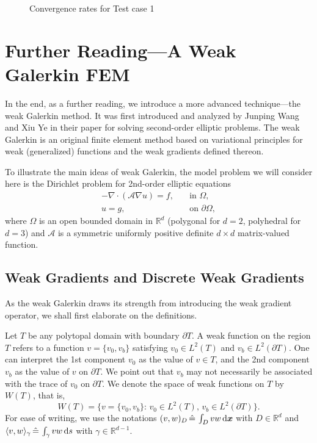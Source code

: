 \begin{figure}[!htbp]
{		}
		\caption{Convergence rates for Test case 1}
		\label{fig:1D convergence rates for test case 1}
	\end{figure}
	
	\clearpage
	\section{Further Reading---A Weak Galerkin FEM}\label{section.6}
	In the end, as a further reading, we introduce a more advanced
	technique---the weak Galerkin method. It was first introduced and analyzed
	by Junping Wang and Xiu Ye in their paper \cite{WG2013} for solving
	second-order elliptic problems. The weak Galerkin 
	is an original finite element method based on variational principles for 
	weak (generalized) functions and the weak gradients defined thereon.
	
	To illustrate the main ideas of weak Galerkin, the model problem we	will 
	consider here is the Dirichlet problem for 2nd-order elliptic equations
	\begin{align}
		-\nabla\cdot(\mathcal{A}\nabla u)=f,\quad &\textrm{in }\Omega,
		\label{eq:WG PDE}\\
		u=g,\quad &\textrm{on }\partial\Omega,\label{eq:WG Dir BC}
	\end{align}
	where $\Omega$ is an open bounded domain in $\mathbb{R}^d$ (polygonal for
	$d=2$, polyhedral for $d=3$) and $\mathcal{A}$ is a symmetric uniformly 
	positive definite $d\times d$ matrix-valued function.

	\subsection{Weak Gradients and Discrete Weak Gradients}
	As the weak Galerkin draws its strength from introducing the weak gradient
	operator, we shall first elaborate on the definitions.
	
	Let $T$ be any polytopal domain with boundary $\partial T$. A weak function
	on the region $T$ refers to a function $v=\{v_0,v_b\}$ satisfying 
	$v_0\in L^2(T)$ and $v_b\in L^2(\partial T)$. One can interpret the 1st
	component $v_0$ as the value of $v\in T$, and the 2nd component $v_b$
	as the value of $v$ on $\partial T$. We point out that $v_b$ may
	not necessarily be associated with the trace of $v_0$ on $\partial T$. We 
	denote the space of weak functions on $T$ by $W(T)$, that is,
	\[ W(T)=\{v=\{v_0,v_b\}:\, v_0 \in L^2(T),\, v_b\in L^2(\partial T)\}.\]	
	For ease of writing, we use the notations 
	$(v,w)_D\,\hat{=}\,\int_D vw\,\mathrm{d}\bm{x}$ with $D\in\mathbb{R}^d$ and
	$\langle v,w \rangle_\gamma\,\hat{=}\,\int_\gamma vw\,\mathrm{d} s$ with
	$\gamma\in\mathbb{R}^{d-1}$.
	
